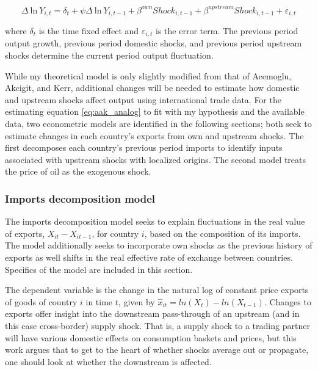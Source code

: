 \documentclass[10pt,letterpaper]{article}
\begin{document}
\begin{equation} \label{eq:aak_analog}
\Delta \ \text{ln} \ Y_{i,t} = \delta_t + \psi \Delta \ \text{ln} \ Y_{i,t-1} + \beta^{own}Shock_{i,t-1} + \beta^{upstream}Shock_{i,t-1} + \varepsilon_{i,t}
\end{equation} 

where $\delta_t$ is the time fixed effect and $\varepsilon_{i,t}$ is the error term. The previous period output growth, previous period domestic shocks, and previous period upstream shocks determine the current period output fluctuation.

While my theoretical model is only slightly modified from that of Acemoglu, Akcigit, and Kerr, additional changes will be needed to estimate how domestic and upstream shocks affect output using international trade data. For the estimating equation \ref{eq:aak_analog} to fit with my hypothesis and the available data, two econometric models are identified in the following sections; both seek to estimate changes in each country's exports from own and upstream shocks. The first decomposes each country's previous period imports to identify inputs associated with upstream shocks with localized origins. The second model treats the price of oil as the exogenous shock. 

\subsubsection{Imports decomposition model} \label{imports_decomp}

The imports decomposition model seeks to explain fluctuations in the real value of exports, $X_{it} - X_{it-1}$, for country $i$, based on the composition of its imports. The model additionally seeks to incorporate own shocks as the previous history of exports as well shifts in the real effective rate of exchange between countries. Specifics of the model are included in this section.

The dependent variable is the change in the natural log of constant price exports of goods of country $i$ in time $t$, given by $\hat{x}_{it} = ln(X_t) - ln(X_{t-1})$. Changes to exports offer insight into the downstream pass-through of an upstream (and in this case cross-border) supply shock. That is, a supply shock to a trading partner will have various domestic effects on consumption baskets and prices, but this work argues that to get to the heart of whether shocks average out or propagate, one should look at whether the downstream is affected.
\end{document}
